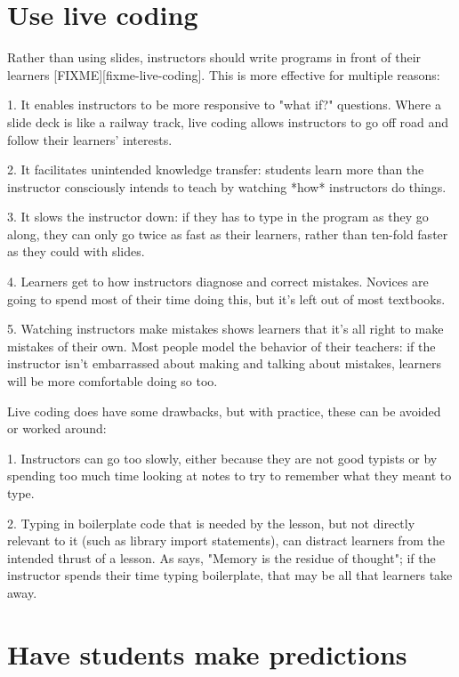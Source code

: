 \documentclass{article}
\begin{document}
\section{Use live coding}

Rather than using slides,
instructors should write programs in front of their learners [FIXME][fixme-live-coding].
This is more effective for multiple reasons:

1.  It enables instructors to be more responsive to "what if?"
    questions. Where a slide deck is like a railway track, live coding
    allows instructors to go off road and follow their learners'
    interests.

2.  It facilitates unintended knowledge transfer: students learn more
    than the instructor consciously intends to teach by watching *how*
    instructors do things.

3.  It slows the instructor down: if they has to type in the program
    as they go along, they can only go twice as fast as their
    learners, rather than ten-fold faster as they could with slides.

4.  Learners get to how instructors diagnose and correct
    mistakes. Novices are going to spend most of their time doing
    this, but it's left out of most textbooks.

5.  Watching instructors make mistakes shows learners that it's all
    right to make mistakes of their own.  Most people model the
    behavior of their teachers: if the instructor isn't embarrassed
    about making and talking about mistakes, learners will be more
    comfortable doing so too.

Live coding does have some drawbacks, but with practice, these can be
avoided or worked around:

1.  Instructors can go too slowly, either because they are not good
    typists or by spending too much time looking at notes to try to
    remember what they meant to type.

2.  Typing in boilerplate code that is needed by the lesson, but not
    directly relevant to it (such as library import statements), can
    distract learners from the intended thrust of a lesson.  As
    \citet{willingham-book} says, "Memory is the residue of thought";
    if the instructor spends their time typing boilerplate, that may
    be all that learners take away.

\section{Have students make predictions}
\end{document}
